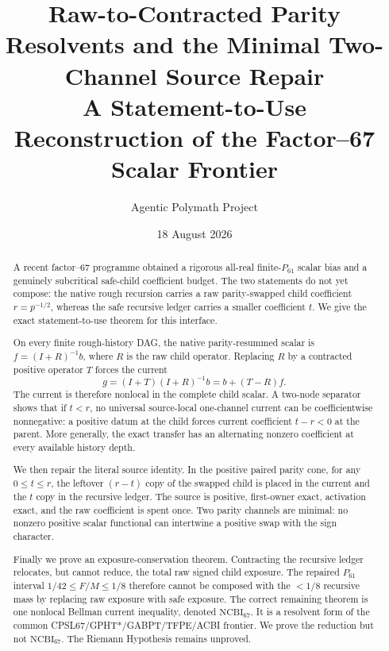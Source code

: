 \documentclass[11pt]{article}
\title{Raw-to-Contracted Parity Resolvents and the Minimal Two-Channel Source Repair\\
\large A Statement-to-Use Reconstruction of the Factor--67 Scalar Frontier}
\author{Agentic Polymath Project}
\date{18 August 2026}
\newcommand{\1}{\mathbf 1}
\newcommand{\NCBI}{\mathrm{NCBI}_{67}}
\begin{document}
\maketitle

\begin{abstract}
A recent factor--67 programme obtained a rigorous all-real finite-$P_{61}$
scalar bias and a genuinely subcritical safe-child coefficient budget.  The two
statements do not yet compose: the native rough recursion carries a raw
parity-swapped child coefficient $r=p^{-1/2}$, whereas the safe recursive ledger
carries a smaller coefficient $t$.  We give the exact statement-to-use theorem
for this interface.

On every finite rough-history DAG, the native parity-resummed scalar is
$f=(I+R)^{-1}b$, where $R$ is the raw child operator.  Replacing $R$ by a
contracted positive operator $T$ forces the current
\[
 g=(I+T)(I+R)^{-1}b=b+(T-R)f.
\]
The current is therefore nonlocal in the complete child scalar.  A two-node
separator shows that if $t<r$, no universal source-local one-channel current can
be coefficientwise nonnegative: a positive datum at the child forces current
coefficient $t-r<0$ at the parent.  More generally, the exact transfer has an
alternating nonzero coefficient at every available history depth.

We then repair the literal source identity.  In the positive paired parity
cone, for any $0\le t\le r$, the leftover $(r-t)$ copy of the swapped child is
placed in the current and the $t$ copy in the recursive ledger.  The source is
positive, first-owner exact, activation exact, and the raw coefficient is spent
once.  Two parity channels are minimal: no nonzero positive scalar functional
can intertwine a positive swap with the sign character.

Finally we prove an exposure-conservation theorem.  Contracting the recursive
ledger relocates, but cannot reduce, the total raw signed child exposure.  The
repaired $P_{61}$ interval $1/42\le F/M\le1/8$ therefore cannot be composed with
the $<1/8$ recursive mass by replacing raw exposure with safe exposure.  The
correct remaining theorem is one nonlocal Bellman current inequality, denoted
$\NCBI$.  It is a resolvent form of the common CPSL67/GPHT*/GABPT/TFPE/ACBI
frontier.  We prove the reduction but not $\NCBI$.  The Riemann Hypothesis
remains unproved.
\end{abstract}

\begin{center}
\end{center}
\end{document}
